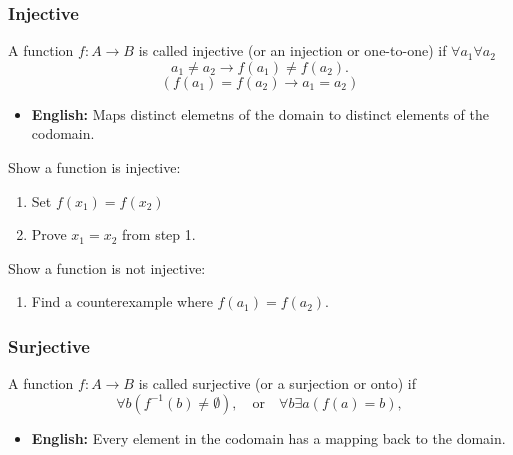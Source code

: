     \subsubsection{Injective}
    \begin{definition}
        A function \( f: A \to B \) is called injective (or an injection or one-to-one) if $\forall a_1 \forall a_2$
        \[
        a_1 \neq a_2 \rightarrow f(a_1) \neq f(a_2).
        \]
        \[
        (f(a_1) = f(a_2) \rightarrow a_1 = a_2)
        \]

        \begin{itemize}
            \item \textbf{English:} Maps distinct elemetns of the domain to distinct elements of the codomain.
        \end{itemize}
    \end{definition}

    \begin{process}
        Show a function is injective:
        \begin{enumerate}
            \item Set $f(x_1) = f(x_2)$
            \item Prove $x_1 = x_2$ from step 1. 
        \end{enumerate}
        \vspace{1em}

        Show a function is not injective:
        \begin{enumerate}
            \item Find a counterexample where $f(a_1) = f(a_2)$.
        \end{enumerate}
    \end{process}

    \subsubsection{Surjective}
    \begin{definition}
        A function \( f: A \to B \) is called surjective (or a surjection or onto) if 
        \[
        \forall b (f^{-1}(b) \neq \emptyset), \quad \text{or} \quad \forall b \exists a (f(a) = b),
        \]
        \begin{itemize}
            \item \textbf{English:} Every element in the codomain has a mapping back to the domain.
        \end{itemize}

    \end{definition}

